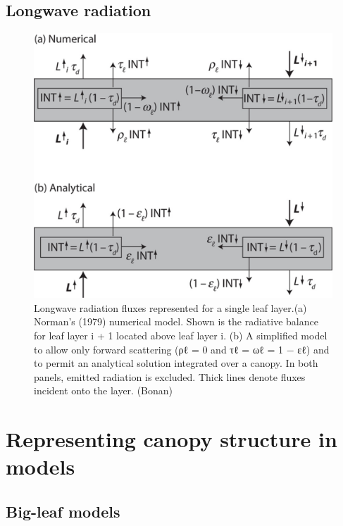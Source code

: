 \documentclass[12pt,oneside]{book}
\begin{document}
\subsection{Longwave radiation}\label{longwave-radiation}

\begin{figure}

{\centering \includegraphics[width=0.8\linewidth]{figures/chap3/f322_LW} 

}

\caption{Longwave radiation fluxes represented for a single leaf layer.(a) Norman’s (1979) numerical model. Shown is the radiative balance for leaf layer i + 1 located above leaf layer i. (b) A simplified model to allow only forward scattering (ρℓ = 0 and τℓ = ωℓ = 1 − εℓ) and to permit an analytical solution integrated over a canopy. In both panels, emitted radiation is excluded. Thick lines denote fluxes incident onto the layer. (Bonan)}\label{fig:f322}
\end{figure}

\section{Representing canopy structure in
models}\label{representing-canopy-structure-in-models}

\subsection{Big-leaf models}\label{big-leaf-models}
\end{document}
